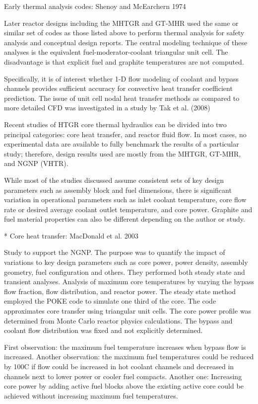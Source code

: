 Early thermal analysis codes:
Shenoy and McEarchern 1974 %

Later reactor designs including the MHTGR and GT-MHR used the same or similar set of codes as those listed above to perform thermal analysis for safety analysis and conceptual design reports.
The central modeling technique of these analyses is the equivalent fuel-moderator-coolant triangular unit cell.
The disadvantage is that explicit fuel and graphite temperatures are not computed.

Specifically, it is of interest whether 1-D flow modeling of coolant and bypass channels provides sufficient accuracy for convective heat transfer coefficient prediction.
The issue of unit cell nodal heat transfer methods as compared to more detailed CFD was investigated in a study by Tak et al. (2008) %

Recent studies of HTGR core thermal hydraulics can be divided into two principal categories: core heat transfer, and reactor fluid flow.
In most cases, no experimental data are available to fully benchmark the results of a particular study; therefore, design results used are mostly from the MHTGR, GT-MHR, and NGNP (VHTR).

While most of the studies discussed assume consistent sets of key design parameters such as assembly block and fuel dimensions, there is significant variation in operational parameters such as inlet coolant temperature, core flow rate or desired average coolant outlet temperature, and core power.
Graphite and fuel material properties can also be different depending on the author or study.

* Core heat transfer:
MacDonald et al. 2003 %

Study to support the NGNP.
The purpose was to quantify the impact of variations to key design parameters such as core power, power density, assembly geometry, fuel configuration and others.
They performed both steady state and transient analyses.
Analysis of maximum core temperatures by varying the bypass flow fraction, flow distribution, and reactor power.
The steady state method employed the POKE code to simulate one third of the core.
The code approximates core transfer using triangular unit cells.
The core power profile was determined from Monte Carlo reactor physics calculations.
The bypass and coolant flow distribution was fixed and not explicitly determined.

First observation: the maximum fuel temperature increases when bypass flow is increased.
Another observation: the maximum fuel temperatures could be reduced by 100C if flow could be increased in hot coolant channels and decreased in channels next to lower power or cooler fuel compacts.
Another one: Increasing core power by adding active fuel blocks above the existing active core could be achieved without increasing maximum fuel temperatures.

